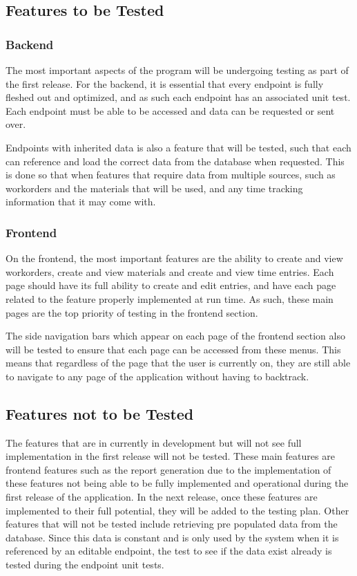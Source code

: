 {{{{{{{\subsection{Features to be Tested}
\subsubsection{Backend}
The most important aspects of the program will be undergoing testing as part of the first release. For the backend, it is essential that every endpoint is fully fleshed out and optimized, and as such each endpoint has an associated unit test. Each endpoint must be able to be accessed and data can be requested or sent over.   
\newline
{\setlength{\parindent}{0cm}

Endpoints with inherited data is also a feature that will be tested, such that each can reference and load the correct data from the database when requested. This is done so that when features that require data from multiple sources, such as workorders and the materials that will be used, and any time tracking information that it may come with. 

\subsubsection{Frontend}
On the frontend, the most important features are the ability to create and view workorders, create and view materials and create and view time entries. Each page should have its full ability to create and edit entries, and have each page related to the feature properly implemented at run time. As such, these main pages are the top priority of testing in the frontend section. 
\newline
{\setlength{\parindent}{0cm}
The side navigation bars which appear on each page of the frontend section also will be tested to ensure that each page can be accessed from these menus. This means that regardless of the page that the user is currently on, they are still able to navigate to any page of the application without having to backtrack. 

\subsection{Features not to be Tested}
The features that are in currently in development but will not see full implementation in the first release will not be tested. These main features are frontend features such as the report generation due to the implementation of these features not being able to be fully implemented and operational during the first release of the application. In the next release, once these features are implemented to their full potential, they will be added to the testing plan. Other features that will not be tested include retrieving pre populated data from the database. Since this data is constant and is only used by the system when it is referenced by an editable endpoint, the test to see if the data exist already is tested during the endpoint unit tests. 
\newline
{\setlength{\parindent}{0cm}

}}}}}}}}}}
